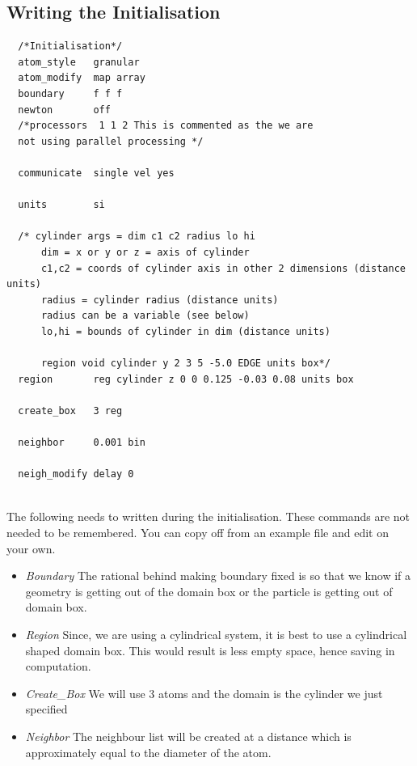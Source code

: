 \documentclass{tufte-book} %
\begin{document}
\subsection{Writing the Initialisation}
\begin{verbatim}
  /*Initialisation*/
  atom_style   granular
  atom_modify  map array
  boundary     f f f
  newton       off
  /*processors  1 1 2 This is commented as the we are
  not using parallel processing */

  communicate  single vel yes

  units        si

  /* cylinder args = dim c1 c2 radius lo hi
      dim = x or y or z = axis of cylinder
      c1,c2 = coords of cylinder axis in other 2 dimensions (distance units)
      radius = cylinder radius (distance units)
      radius can be a variable (see below)
      lo,hi = bounds of cylinder in dim (distance units)

      region void cylinder y 2 3 5 -5.0 EDGE units box*/
  region       reg cylinder z 0 0 0.125 -0.03 0.08 units box 

  create_box   3 reg

  neighbor     0.001 bin

  neigh_modify delay 0
  
\end{verbatim}
The following needs to written during the initialisation. These commands are not needed to be remembered. You can copy off from an example file and edit on your own.
\begin{itemize}
\item \textit{Boundary} The rational behind making boundary fixed is so that we know if a geometry is getting out of the domain box or the particle is getting out of domain box.
\item \textit{Region} Since, we are using a cylindrical system, it is best to use a cylindrical shaped domain box. This would result is less empty space, hence saving in computation. 
\item \textit{Create\_Box} We will use 3 atoms and the domain is the cylinder we just specified
\item \textit{Neighbor} The neighbour list will be created at a distance which is approximately equal to the diameter of the atom.
\end{itemize}
\end{document}
